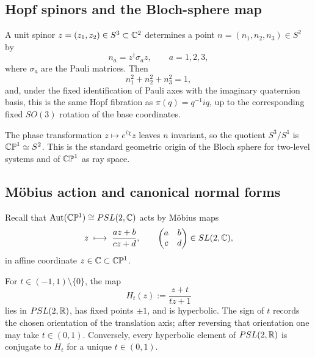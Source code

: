 \documentclass[11pt]{article}
\begin{document}
\subsection{Hopf spinors and the Bloch-sphere map}
\label{p1:subsec:hopf-spinors}

A unit spinor \(z=(z_1,z_2)\in S^3\subset\mathbb{C}^2\) determines a point
\(n=(n_1,n_2,n_3)\in S^2\) by
\[
n_a = z^\dagger \sigma_a z,
\qquad a=1,2,3,
\]
where \(\sigma_a\) are the Pauli matrices. Then
\[
n_1^2+n_2^2+n_3^2=1,
\]
and, under the fixed identification of Pauli axes with the imaginary quaternion basis, this is the same Hopf fibration as \(\pi(q)=q^{-1}iq\), up to the corresponding fixed \(SO(3)\) rotation of the base coordinates.

\begin{remark}
The phase transformation \(z\mapsto e^{i\chi}z\) leaves \(n\) invariant, so the
quotient \(S^3/S^1\) is \(\mathbb{CP}^1\simeq S^2\). This is the standard geometric origin
of the Bloch sphere for two-level systems and of \(\mathbb{CP}^1\) as ray space.
\cite{BengtssonZyczkowski2007,Perelomov1986}
\end{remark}


\subsection{M\"obius action and canonical normal forms}
\label{p1:subsec:mobius-normal-forms}

Recall that $\operatorname{Aut}(\mathbb{C}\mathbb{P}^1)\cong PSL(2,\mathbb{C})$ acts by M\"obius maps
\[
z\;\longmapsto\;\frac{az+b}{cz+d},\qquad 
\begin{pmatrix}a&b\\c&d
\end{pmatrix}
\in SL(2,\mathbb{C}),
\]
in affine coordinate $z\in\mathbb{C}\subset\mathbb{C}\mathbb{P}^1$.

\begin{theorem}
\label{p1:thm:hyperbolic-normal-form}
For $t\in(-1,1)\setminus\{0\}$, the map
\begin{equation}
\label{p1:eq:H_t-geom}
H_t(z):=\frac{z+t}{tz+1}
\end{equation}
lies in $PSL(2,\mathbb{R})$, has fixed points $\pm1$, and is hyperbolic. The sign of \(t\) records the chosen orientation of the translation axis; after reversing that orientation one may take \(t\in(0,1)\). Conversely, every hyperbolic element of
$PSL(2,\mathbb{R})$ is conjugate to $H_t$ for a unique $t\in(0,1)$.
\end{theorem}
\end{document}
